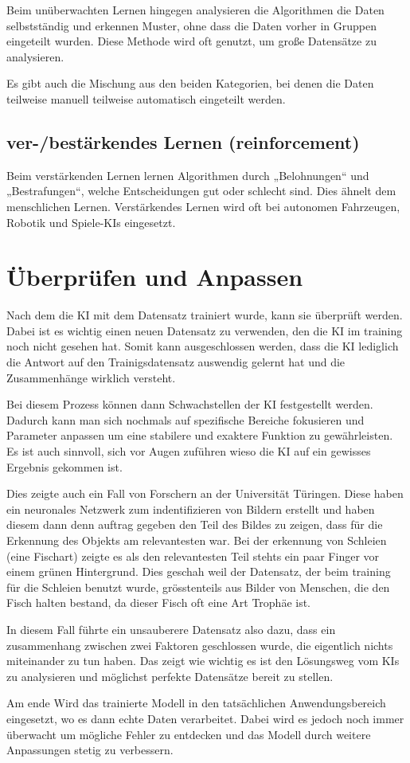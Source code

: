 \vspace{1em}
\noindent
Beim unüberwachten Lernen hingegen analysieren die Algorithmen die Daten selbstständig und erkennen Muster, ohne dass die Daten vorher in Gruppen eingeteilt wurden. 
Diese Methode wird oft genutzt, um große Datensätze zu analysieren.

\vspace{1em}
\noindent
Es gibt auch die Mischung aus den beiden Kategorien, bei denen die Daten teilweise manuell teilweise automatisch eingeteilt werden.

\subsection{ver-/bestärkendes Lernen (reinforcement)}
Beim verstärkenden Lernen lernen Algorithmen durch „Belohnungen“ und „Bestrafungen“, welche Entscheidungen gut oder schlecht sind. Dies ähnelt dem menschlichen Lernen. 
Verstärkendes Lernen wird oft bei autonomen Fahrzeugen, Robotik und Spiele-KIs eingesetzt.

\section{Überprüfen und Anpassen}
Nach dem die KI mit dem Datensatz trainiert wurde, kann sie überprüft werden. Dabei ist es wichtig einen neuen Datensatz zu verwenden, den die KI im training noch nicht gesehen hat. Somit kann ausgeschlossen werden, dass die KI lediglich die Antwort auf den Trainigsdatensatz auswendig gelernt hat und die Zusammenhänge wirklich versteht.

Bei diesem Prozess können dann Schwachstellen der KI festgestellt werden. Dadurch kann man sich nochmals auf spezifische Bereiche fokusieren und Parameter anpassen um eine stabilere und exaktere Funktion zu gewährleisten.
Es ist auch sinnvoll, sich vor Augen zuführen wieso die KI auf ein gewisses Ergebnis gekommen ist.

Dies zeigte auch ein Fall von Forschern an der Universität Türingen. \citep{tench-messy-data}
Diese haben ein neuronales Netzwerk zum indentifizieren von Bildern erstellt und haben diesem dann denn auftrag gegeben den Teil des Bildes zu zeigen, dass für die Erkennung des Objekts am relevantesten war.
Bei der erkennung von Schleien (eine Fischart) zeigte es als den relevantesten Teil stehts ein paar Finger vor einem grünen Hintergrund. Dies geschah weil der Datensatz, der beim training für die Schleien benutzt wurde, grösstenteils aus Bilder von Menschen, die den Fisch halten bestand, da dieser Fisch oft eine Art Trophäe ist.

\noindent
In diesem Fall führte ein unsauberere Datensatz also dazu, dass ein zusammenhang zwischen zwei Faktoren geschlossen wurde, die eigentlich nichts miteinander zu tun haben. Das zeigt wie wichtig es ist den Lösungsweg vom KIs zu analysieren und möglichst perfekte Datensätze bereit zu stellen.

Am ende Wird das trainierte Modell in den tatsächlichen Anwendungsbereich eingesetzt, wo es dann echte Daten verarbeitet. 
Dabei wird es jedoch noch immer überwacht um mögliche Fehler zu entdecken und das Modell durch weitere Anpassungen stetig zu verbessern.